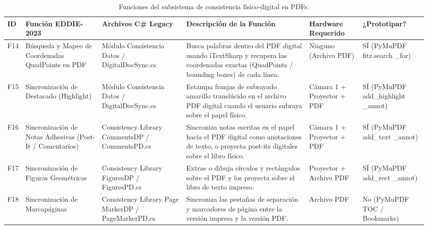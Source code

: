 \begin{table}[H]
    \centering
    \caption{Funciones del subsistema de consistencia físico-digital en PDFs.}
    \label{tab:func_consistencia_pdf}
    \begin{small}
    \begin{tabular}{L{0.6cm} L{2.2cm} L{2.2cm} L{4.1cm} L{1.6cm} L{1.8cm}}
        \toprule
        ID & Función EDDIE-2023 & Archivos C\# Legacy & Descripción de la Función & Hardware Requerido & ¿Prototipar? \\ \midrule
        F14 & Búsqueda y Mapeo de Coordenadas QuadPoints en PDF & Módulo Consistencia Datos / DigitalDocSync.cs & Busca palabras dentro del PDF digital usando iTextSharp y recupera las coordenadas exactas (QuadPoints / bounding boxes) de cada línea. & Ninguno (Archivo PDF) & SÍ (PyMuPDF fitz.search \_for) \\ \midrule
        F15 & Sincronización de Destacado (Highlight) & Módulo Consistencia Datos / DigitalDocSync.cs & Estampa franjas de subrayado amarillo translúcido en el archivo PDF digital cuando el usuario subraya sobre el papel físico. & Cámara 1 + Proyector + PDF & SÍ (PyMuPDF add\_highlight \_annot) \\ \midrule
        F16 & Sincronización de Notas Adhesivas (Post-It / Comentarios) & Consistency Library CommentsDP / CommentsPD.cs & Sincroniza notas escritas en el papel hacia el PDF digital como anotaciones de texto, o proyecta post-its digitales sobre el libro físico. & Cámara 1 + Proyector + PDF & SÍ (PyMuPDF add\_text \_annot) \\ \midrule
        F17 & Sincronización de Figuras Geométricas & Consistency Library FiguresDP / FiguresPD.cs & Extrae o dibuja círculos y rectángulos sobre el PDF y los proyecta sobre el libro de texto impreso. & Proyector + Archivo PDF & SÍ (PyMuPDF add\_rect \_annot) \\ \midrule
        F18 & Sincronización de Marcapáginas & Consistency Library Page MarkerDP / PageMarkerPD.cs & Sincroniza las pestañas de separación y marcadores de página entre la versión impresa y la versión PDF. & Archivo PDF & No (PyMuPDF TOC / Bookmarks) \\ \bottomrule
    \end{tabular}
    \end{small}
\end{table}
 
